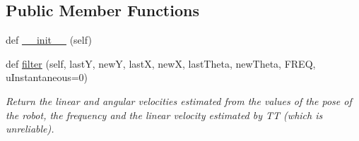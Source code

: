 \subsection*{Public Member Functions}
\begin{DoxyCompactItemize}
\item 
def \hyperlink{classcmd__TTB_1_1butterworth_1_1ButterworthFilter_a8f569482d8099798494dc38a16589f8f}{\+\_\+\+\_\+init\+\_\+\+\_\+} (self)
\item 
def \hyperlink{classcmd__TTB_1_1butterworth_1_1ButterworthFilter_a770af7ed4ce5ed48fc9db1d42ca0b588}{filter} (self, lastY, newY, lastX, newX, last\+Theta, new\+Theta, F\+R\+EQ, u\+Instantaneous=0)
\begin{DoxyCompactList}\small\item\em Return the linear and angular velocities estimated from the values of the pose of the robot, the frequency and the linear velocity estimated by TT (which is unreliable). \end{DoxyCompactList}\end{DoxyCompactItemize}
